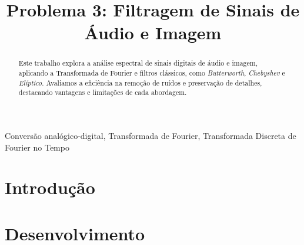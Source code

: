 \documentclass[conference]{IEEEtran}
\begin{document}
\makeatletter
\newcommand{\linebreakand}{%
    \end{@IEEEauthorhalign}
    \hfill\mbox{}\par
    \mbox{}\hfill\begin{@IEEEauthorhalign}
}
\makeatother

\title{Problema 3: Filtragem de Sinais de Áudio e Imagem \\
}

\author{
    \and
    \IEEEauthorblockN{}
    \IEEEauthorblockA{}
}

\maketitle

\begin{abstract}
    Este trabalho explora a análise espectral de sinais digitais de áudio e imagem, aplicando a Transformada de Fourier e filtros clássicos, como \textit{Butterworth}, \textit{Chebyshev} e \textit{Elíptico}. Avaliamos a eficiência na remoção de ruídos e preservação de detalhes, destacando vantagens e limitações de cada abordagem.


\end{abstract}

\begin{IEEEkeywords}
    Conversão analógico-digital, Transformada de Fourier, Transformada Discreta de Fourier no Tempo
\end{IEEEkeywords}

\section{Introdução}


\section{Desenvolvimento}

\end{document}
